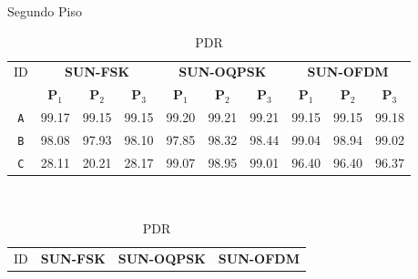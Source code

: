 \begin{table}[H]
      \caption{Segundo Piso}
      \begin{subtable}{\textwidth}
            \begin{center}
                  \begin{tabular}{|c|c|c|c|c|c|c|c|c|c|}
                        \hline
                        ID         & \multicolumn{3}{c|}{\textbf{SUN-FSK}} & \multicolumn{3}{c|}{\textbf{SUN-OQPSK}} & \multicolumn{3}{c|}{\textbf{SUN-OFDM}}                                                                                                       \\ \cline{2-10}
                                   & \textbf{P$_1$}                        & \textbf{P$_2$}                          & \textbf{P$_3$}                         & \textbf{P$_1$} & \textbf{P$_2$} & \textbf{P$_3$} & \textbf{P$_1$} & \textbf{P$_2$} & \textbf{P$_3$} \\ \hline
                        \texttt{A} & 99.17                                 & 99.15                                   & 99.15                                  & 99.20          & 99.21          & 99.21          & 99.15          & 99.15          & 99.18          \\ \hline
                        \texttt{B} & 98.08                                 & 97.93                                   & 98.10                                  & 97.85          & 98.32          & 98.44          & 99.04          & 98.94          & 99.02          \\ \hline
                        \texttt{C} & 28.11                                 & 20.21                                   & 28.17                                  & 99.07          & 98.95          & 99.01          & 96.40          & 96.40          & 96.37          \\ \hline
                  \end{tabular}
                  \caption{PDR}
                  \label{table:pdr2}
            \end{center}
      \end{subtable}%
      \\
      \par\bigskip
      \begin{subtable}{\textwidth}
            \begin{center}
                  \begin{tabular}{|c|c|c|c|c|c|c|c|c|c|}
                        \hline
                        ID         & \multicolumn{3}{c|}{\textbf{SUN-FSK}} & \multicolumn{3}{c|}{\textbf{SUN-OQPSK}} & \multicolumn{3}{c|}{\textbf{SUN-OFDM}}                                                                                                       \\ \cline{2-10}

\end{tabular}
\end{center}
\end{subtable}
\end{table}
